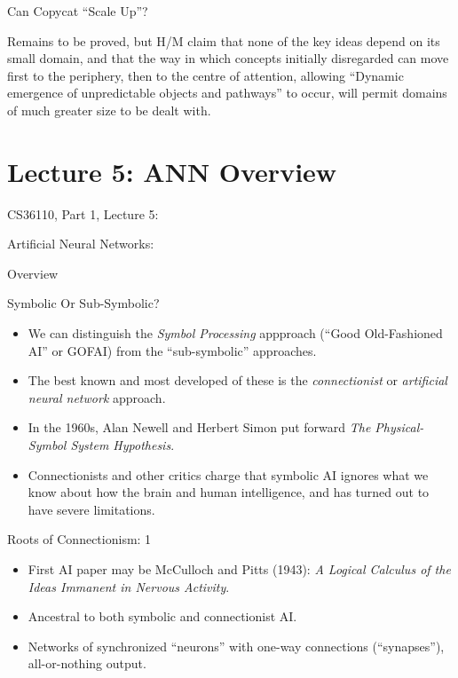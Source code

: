 \documentclass{article}
\begin{document}
\begin{slide}
{\Large Can Copycat ``Scale Up''?}

Remains to be proved, but H/M claim that none of the key ideas depend
on its small domain, and that the way in which concepts initially
disregarded can move first to the 
periphery, then to the centre of attention, allowing ``Dynamic
emergence of unpredictable objects and pathways'' to
occur, will permit domains of much greater size to be dealt with.

\end{slide}

\section{Lecture 5: ANN Overview}
\begin{slide}{}
{\Large CS36110, Part 1, Lecture 5:}

{\Large Artificial Neural Networks:}

{\Large Overview}

\end{slide}

\begin{slide}{}
{\Large Symbolic Or Sub-Symbolic?}
\begin{itemize}
\item We can distinguish the {\em Symbol Processing} appproach (``Good
Old-Fashioned AI'' or GOFAI) from the ``sub-symbolic'' approaches.
\item The
best known and most developed of these is the {\em connectionist} or
{\em artificial
neural network} approach.
\item In the 1960s, Alan Newell and Herbert Simon put forward {\em The
Physical-Symbol System Hypothesis}.
\item Connectionists and other critics charge that symbolic AI ignores
what we know about how the brain and human intelligence, and has
turned out to have severe limitations.
\end{itemize}
\end{slide}

\begin{slide}{}
{\Large Roots of Connectionism: 1}
\begin{itemize}
\item First AI paper may be McCulloch and Pitts
(1943): {\em A Logical Calculus of the Ideas Immanent in Nervous
Activity}. 
\item Ancestral to both symbolic and
connectionist AI. 
\item Networks of synchronized ``neurons'' with one-way connections
(``synapses''), all-or-nothing output.
\end{itemize}
\end{slide}
\end{document}
